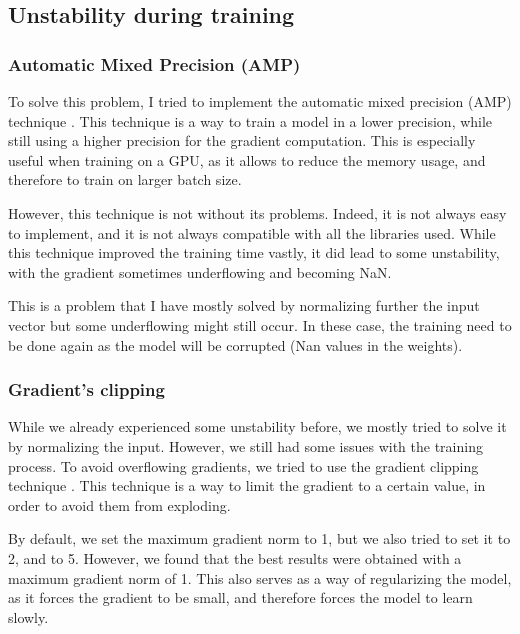 \documentclass[11pt]{article}
\begin{document}
    \subsection{Unstability during training}

    \subsubsection{Automatic Mixed Precision (AMP)}

            To solve this problem, I tried to implement the automatic mixed precision (AMP) technique \cite{automatic_mixed_precision}. This technique is a way to train a model in a lower precision, while still using a higher precision for the gradient computation.
            This is especially useful when training on a GPU, as it allows to reduce the memory usage, and therefore to train on larger batch size.

            However, this technique is not without its problems. Indeed, it is not always easy to implement, and it is not always compatible with all the libraries used.
            While this technique improved the training time vastly, it did lead to some unstability, with the gradient sometimes underflowing and becoming NaN.

            This is a problem that I have mostly solved by normalizing further the input vector but some underflowing might still occur. In these case, the training need to be done
            again as the model will be corrupted (Nan values in the weights).


    \subsubsection{Gradient's clipping}

        While we already experienced some unstability before, we mostly tried to solve it by normalizing the input.
        However, we still had some issues with the training process. To avoid overflowing gradients, we tried to use the gradient clipping technique \cite{gradient_clipping}.
        This technique is a way to limit the gradient to a certain value, in order to avoid them from exploding.

        By default, we set the maximum gradient norm to 1, but we also tried to set it to 2, and to 5. However, we found that the best results were obtained with a maximum gradient norm of 1.
        This also serves as a way of regularizing the model, as it forces the gradient to be small, and therefore forces the model to learn slowly.


    \newpage
    {
    \small

    \printbibliography
    }
\end{document}
